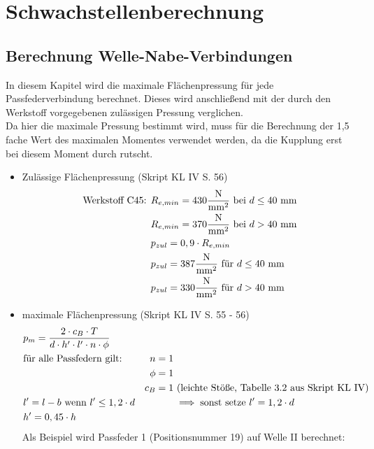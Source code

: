 \chapter{Schwachstellenberechnung}
\section{Berechnung Welle-Nabe-Verbindungen}
In diesem Kapitel wird die maximale Flächenpressung für jede Passfederverbindung berechnet. Dieses wird anschließend mit der durch den Werkstoff vorgegebenen zulässigen Pressung verglichen. \\
Da hier die maximale Pressung bestimmt wird, muss für die Berechnung der 1,5 fache Wert des maximalen Momentes verwendet werden, da die Kupplung erst bei diesem Moment durch rutscht. \\ 
\begin{itemize}
	\item Zulässige Flächenpressung \hfill  (Skript KL IV S. 56)
	\begin{align*}
		\text{Werkstoff C45: } &R_{e,min} = 430 \frac{\text{N}}{\text{mm}^2} \text{ bei } d\le 40 \text{ mm} \\
		 &R_{e,min} = 370 \frac{\text{N}}{\text{mm}^2} \text{ bei } d> 40 \text{ mm} \\
		 &p_{zul} = 0,9 \cdot R_{e,min}  \\
		 &p_{zul} = 387 \frac{\text{N}}{\text{mm}^2} \text{ für } d\le 40 \text{ mm} \\
		  &p_{zul} = 330 \frac{\text{N}}{\text{mm}^2} \text{ für } d> 40 \text{ mm} \\
	\end{align*}
	\item maximale Flächenpressung \hfill (Skript KL IV S. 55 - 56)
	\begin{align*}
		&p_m = \frac{2 \cdot c_B \cdot T}{d \cdot h' \cdot l' \cdot n \cdot \phi} && \\
		&\text{für alle Passfedern gilt: } &n=1 & \\
		& &\phi = 1& \\
		& &c_B = 1 &\text{ (leichte Stöße, Tabelle 3.2 aus Skript KL IV)}\\
		& l' = l - b \text{ wenn } l'\le 1,2 \cdot d &&\implies \text{sonst setze } l' = 1,2 \cdot d \\
		&h' = 0,45 \cdot h &&\\
	\end{align*}
	Als Beispiel wird Passfeder 1 (Positionsnummer 19) auf Welle II berechnet:
	\begin{align*}

\end{align*}
\end{itemize}
